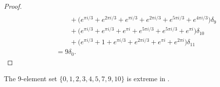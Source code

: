 \begin{proof}
\begin{align*}
\end{align*}
\begin{align*}
\phantom{\mu * \tilde\mu}&\qquad  +  \big( e^{\pi i / 3}+ e^{ 2 \pi i / 3}+ e^{\pi i / 3}+ e^{ 2 \pi i / 3}+ e^{ 5 \pi i / 3}+ e^{ 4 \pi i / 3}\big)\delta_{9} \\&\qquad  +  \big( e^{\pi i / 3}+ e^{\pi i / 3}+ e^{\pi  i}+ e^{ 5 \pi i / 3}+ e^{ 5 \pi i / 3}+ e^{\pi  i}\big)\delta_{10} \\&\qquad  +  \big( e^{\pi i / 3}+ 1+ e^{\pi i / 3}+ e^{ 2 \pi i / 3}+ e^{\pi  i}+ e^{ 2 \pi i}\big)\delta_{11} 
   \\&=9\delta_0. 
\end{align*}
\end{proof}


\begin{prop}\label{prop9in13} The 9-element set
$\{0, 1, 2, 3, 4, 5, 7, 9, 10\}$ is extreme in .
\end{prop}

